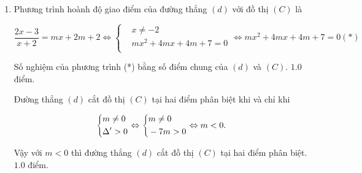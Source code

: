 \begin{ex}[4 điểm]
{\begin{enumerate}
\item  
Phương trình hoành độ giao điểm của đường thẳng $(d)$ với đồ thị $(C)$ là

$\dfrac{2x-3}{x+2}=mx+ 2m +2\Leftrightarrow \left\{\begin{aligned}&x\ne -2 \\ &mx^2+4mx+4m+7=0 \\ \end{aligned}\right.\Leftrightarrow mx^2+4mx+4m+7=0\left(*\right)$

   Số nghiệm của phương trình (*) bằng số điểm chung của $(d)$ và $(C)$. \dotfill $1.0$ điểm.
   
Đường thẳng $(d)$ cắt đồ thị $(C)$ tại hai điểm phân biệt khi và chỉ khi 

$$\left\{\begin{aligned}&m\ne 0\\&\Delta'>0\end{aligned}\right. \Leftrightarrow \left\{\begin{aligned}& m\ne 0\\&-7m >0\end{aligned}\right. \Leftrightarrow m<0.$$
 
  Vậy với $ m < 0$ thì  đường thẳng $(d)$ cắt đồ thị  $(C)$ tại hai điểm phân biệt.
 \dotfill $1.0$ điểm.
\end{enumerate}	 

}
\end{ex}

